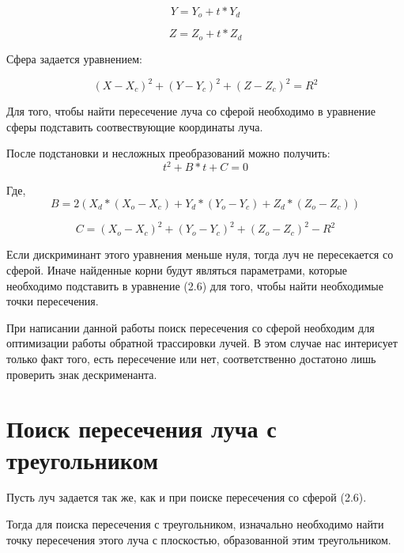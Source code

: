 \documentclass[12pt]{report}
\begin{document}
	\begin{equation}
		Y = Y_{o} + t*Y_{d}
	\end{equation}
	
	\begin{equation}
		Z = Z_{o} + t*Z_{d}
	\end{equation}
	
	
	Сфера задается уравнением:
		
	\begin{equation}
		(X - X_{c})^2 + (Y - Y_{c})^2 + (Z - Z_{c})^2 = R^2
	\end{equation}
	
	Для того, чтобы найти пересечение луча со сферой необходимо в уравнение сферы подставить соотвествующие координаты луча.
	
	После подстановки и несложных преобразований можно получить:
	\begin{equation}
		t^2 + B*t + C = 0
	\end{equation}
	
	Где,
	\begin{equation}
		B = 2(X_{d}*(X_{o} - X_{c}) + Y_{d}*(Y_{o} - Y_{c}) + Z_{d}*(Z_{o} - Z_{c}))
	\end{equation}
	
	\begin{equation}
		C = (X_{o} - X_{c})^2 + (Y_{o} - Y_{c})^2 + (Z_{o} - Z_{c})^2 - R^2
	\end{equation}
	
	Если дискриминант этого уравнения меньше нуля, тогда луч не пересекается со сферой. Иначе найденные корни будут являться параметрами, которые необходимо подставить в уравнение (2.6) для того, чтобы найти необходимые точки пересечения.
	
	При написании данной работы поиск пересечения со сферой необходим для оптимизации работы обратной трассировки лучей. В этом случае нас интерисует только факт того, есть пересечение или нет, соответственно достатоно лишь проверить знак дескрименанта.
	
	\section{Поиск пересечения луча с треугольником}
	
	Пусть луч задается так же, как и при поиске пересечения со сферой (2.6).
	
	Тогда для поиска пересечения с треугольником, изначально необходимо найти точку пересечения этого луча с плоскостью, образованной этим треугольником.
	
\end{document}
